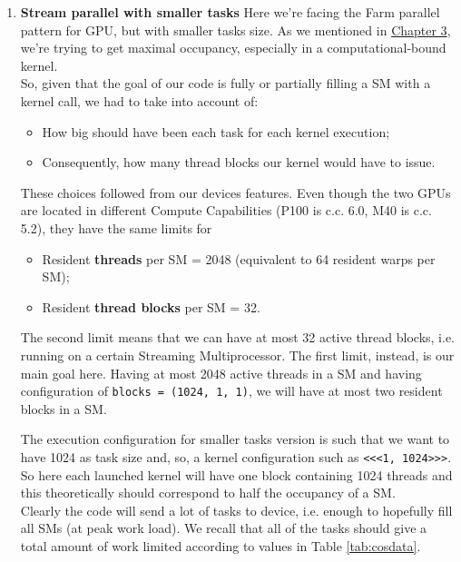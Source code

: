 \begin{enumerate}
		
	\item \textbf{Stream parallel with smaller tasks}
		Here we're facing the Farm parallel pattern for GPU, but with smaller tasks size.
		As we mentioned in \hyperref[chap:logic]{Chapter 3}, we're trying to get maximal occupancy, especially in a computational-bound kernel.\\
		So, given that the goal of our code is fully or partially filling a SM with a kernel call, we had to take into account of: 
		\begin{itemize}
			\item How big should have been each task for each kernel execution;
			\item Consequently, how many thread blocks our kernel would have to issue.
		\end{itemize}
		These choices followed from our devices features.
		Even though the two GPUs are located in different Compute Capabilities (P100 is c.c. 6.0, M40 is c.c. 5.2), they have the same limits for 
		\begin{itemize}
			\item Resident \textbf{threads} per SM = 2048 (equivalent to 64 resident warps per SM);
			\item Resident \textbf{thread blocks} per SM = 32.
		\end{itemize}
		The second limit means that we can have at most 32 active thread blocks, i.e. running on a certain Streaming Multiprocessor. 
		The first limit, instead, is our main goal here. Having at most 2048 active threads in a SM and having configuration of \texttt{blocks = (1024, 1, 1)}, we will have at most two resident blocks in a SM.
		
		The execution configuration for smaller tasks version is such that we want to have 1024 as task size and, so, a kernel configuration such as \texttt{<<<1, 1024>>>}. 
		So here each launched kernel will have one block containing 1024 threads and this theoretically should correspond to half the occupancy of a SM.\\
		Clearly the code will send a lot of tasks to device, i.e. enough to hopefully fill all SMs (at peak work load). We recall that all of the tasks should give a total amount of work limited according to values in Table \ref{tab:cosdata}.
		

\end{enumerate}
